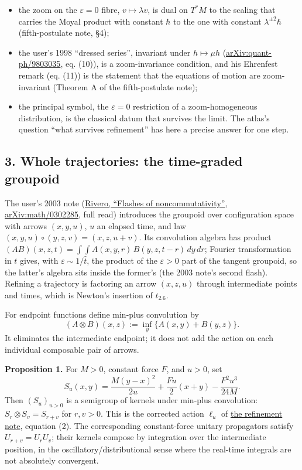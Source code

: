 \documentclass[11pt,a4paper]{article}
\newcommand{\tightlist}{\setlength{\itemsep}{0pt}\setlength{\parskip}{0pt}}
\begin{document}
\begin{itemize}
\tightlist
\item
  the zoom on the \(\varepsilon=0\) fibre, \(v\mapsto\lambda v\), is
  dual on \(T^*M\) to the scaling that carries the Moyal product with
  constant \(\hbar\) to the one with constant \(\lambda^{\pm2}\hbar\)
  (fifth-postulate note, §4);
\item
  the user's 1998 ``dressed series'', invariant under \(h\mapsto\mu h\)
  (\href{https://arxiv.org/abs/quant-ph/9803035}{arXiv:quant-ph/9803035},
  eq. (10)), is a zoom-invariance condition, and his Ehrenfest remark
  (eq. (11)) is the statement that the equations of motion are
  zoom-invariant (Theorem A of the fifth-postulate note);
\item
  the principal symbol, the \(\varepsilon=0\) restriction of a
  zoom-homogeneous distribution, is the classical datum that survives
  the limit. The atlas's question ``what survives refinement'' has here
  a precise answer for one step.
\end{itemize}

\hypertarget{whole-trajectories-the-time-graded-groupoid}{%
\subsection{3. Whole trajectories: the time-graded
groupoid}\label{whole-trajectories-the-time-graded-groupoid}}

The user's 2003 note (\href{https://arxiv.org/abs/math/0302285}{Rivero,
``Flashes of noncommutativity'', arXiv:math/0302285}, full read)
introduces the groupoid over configuration space with arrows
\((x,y,u)\), \(u\) an elapsed time, and law
\((x,y,u)\circ(y,z,v)=(x,z,u+v)\). Its convolution algebra has product
\((AB)(x,z,t)=\int\!\!\int A(x,y,r)\,B(y,z,t-r)\,dy\,dr\); Fourier
transformation in \(t\) gives, with \(\varepsilon\sim1/\hat t\), the
product of the \(\varepsilon>0\) part of the tangent groupoid, so the
latter's algebra sits inside the former's (the 2003 note's second
flash). Refining a trajectory is factoring an arrow \((x,z,u)\) through
intermediate points and times, which is Newton's insertion of
\(t_{2.6}\).

For endpoint functions define min-plus convolution by \[
 (A\otimes B)(x,z):=\inf_y\{A(x,y)+B(y,z)\}.
\] It eliminates the intermediate endpoint; it does not add the action
on each individual composable pair of arrows.

\textbf{Proposition 1.} For \(M>0\), constant force \(F\), and \(u>0\),
set \[S_u(x,y)=\frac{M(y-x)^2}{2u}+\frac{Fu}2(x+y)-\frac{F^2u^3}{24M}.\]
Then \((S_u)_{u>0}\) is a semigroup of kernels under min-plus
convolution: \(S_r\otimes S_v=S_{r+v}\) for \(r,v>0\). This is the
corrected action \(\ell_u\) of
\href{refinement-composition-and-limit.md}{the refinement note},
equation (2). The corresponding constant-force unitary propagators
satisfy \(U_{r+v}=U_rU_v\); their kernels compose by integration over
the intermediate position, in the oscillatory/distributional sense where
the real-time integrals are not absolutely convergent.
\end{document}
